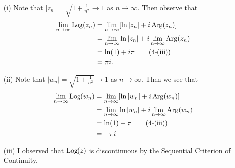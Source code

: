 \documentclass[a4paper]{article}
\begin{document}
\begin{solution}
    \begin{enumerate}
        \item[(i)] Note that \( | {z}_{n} |  = \sqrt{ 1 + \frac{ 1 }{ n^{2} }   } \to 1  \) as \( n \to \infty   \). Then observe that 
            \begin{align*}
                \lim_{ n \to \infty   } \Log({z}_{n}) &= \lim_{ n \to \infty   } [ \ln | {z}_{n} | + i \Arg({z}_{n}) ]   \\
                                                      &=  \lim_{ n \to \infty   }  \ln | {z}_{n} |  + i \lim_{ n \to \infty  }  \Arg({z}_{n}) \\
                                                      &= \ln(1) + i \pi \tag{4-(iii)} \\
                                                      &= \pi i.
            \end{align*}
        \item[(ii)] Note that \( | {w}_{n}  |  = \sqrt{  1 + \frac{ 1 }{ n^{2} }  } \to 1  \) as \( n \to \infty   \). Then we see that 
            \begin{align*}
                \lim_{ n \to \infty  }  \Log({w}_{n}) &= \lim_{ n \to \infty  }  [ \ln | {w}_{n} |  + i \Arg({w}_{n}) ] \\
                                                      &= \lim_{ n \to \infty  }  \ln | {w}_{n} |  + i \lim_{ n \to \infty  }  \Arg({w}_{n}) \\
                                                      &= \ln(1) - \pi \tag{4-(iii)} \\
                                                      &= -\pi  i
            \end{align*}
        \item[(iii)] I observed that \( \operatorname{Log}(z) \) is discontinuous by the Sequential Criterion of Continuity.
    \end{enumerate}
\end{solution}
\end{document}
